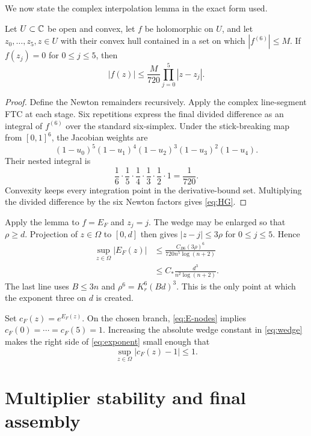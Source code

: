 \documentclass[12pt]{article}
\begin{document}
We now state the complex interpolation lemma in the exact form used.

\begin{lemma}\label{lem:HG}
Let $U\subset\mathbb C$ be open and convex, let $f$ be holomorphic on $U$, and let
$z_0,\ldots,z_5,z\in U$ with their convex hull contained in a set on which
$|f^{(6)}|\le M$.  If $f(z_j)=0$ for $0\le j\le5$, then
\begin{equation}\label{eq:HG}
 |f(z)|\le\frac{M}{720}\prod_{j=0}^{5}|z-z_j|.
\end{equation}
\end{lemma}

\begin{proof}
Define the Newton remainders recursively.  Apply the complex line-segment
FTC at each stage.  Six repetitions express the final divided difference as
an integral of $f^{(6)}$ over the standard six-simplex.  Under the
stick-breaking map from $[0,1]^6$, the Jacobian weights are
\[
 (1-u_0)^5(1-u_1)^4(1-u_2)^3(1-u_3)^2(1-u_4).
\]
Their nested integral is
\[
 \frac16\cdot\frac15\cdot\frac14\cdot\frac13\cdot\frac12\cdot1
 =\frac1{720}.
\]
Convexity keeps every integration point in the derivative-bound set.
Multiplying the divided difference by the six Newton factors gives
\eqref{eq:HG}.
\end{proof}

Apply the lemma to $f=E_F$ and $z_j=j$.  The wedge may be enlarged so that
$\rho\ge d$.  Projection of $z\in\Omega$ to $[0,d]$ then gives
$|z-j|\le3\rho$ for $0\le j\le5$.  Hence
\begin{align}
 \sup_{z\in\Omega}|E_F(z)|
 &\le\frac{C_{B6}(3\rho)^6}{720n^5\log(n+2)}\nonumber\\
 &\le C_\ast\frac{d^3}{n^2\log(n+2)}.
 \label{eq:exponent}
\end{align}
The last line uses $B\le3n$ and
$\rho^6=K_r^6(Bd)^3$.  This is the only point at which the exponent three on
$d$ is created.

Set $c_F(z)=e^{E_F(z)}$.  On the chosen branch, \eqref{eq:E-nodes} implies
$c_F(0)=\cdots=c_F(5)=1$.  Increasing the absolute wedge constant in
\eqref{eq:wedge} makes the right side of \eqref{eq:exponent} small enough
that
\begin{equation}\label{eq:multiplier-close}
 \sup_{z\in\Omega}|c_F(z)-1|\le1.
\end{equation}

\section{Multiplier stability and final assembly}\label{sec:assembly}
\end{document}
